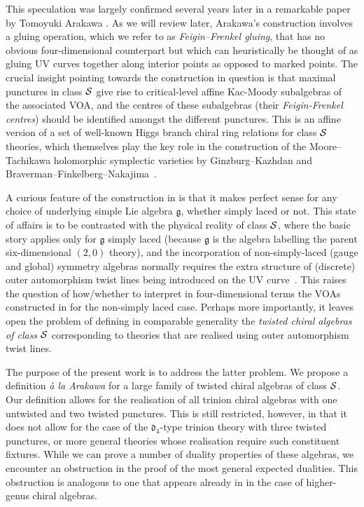 \documentclass[a4paper]{article}
\def\SS{{\cal S}}
\def\df{\mathfrak{d}}
\def\gf{\mathfrak{g}}
\begin{document}
This speculation was largely confirmed several years later in a remarkable paper by Tomoyuki Arakawa \cite{Arakawa:2018egx}. As we will review later, Arakawa's construction involves a gluing operation, which we refer to as \emph{Feigin--Frenkel gluing}, that has no obvious four-dimensional counterpart but which can heuristically be thought of as gluing UV curves together along interior points as opposed to marked points. The crucial insight pointing towards the construction in question is that maximal punctures in class $\SS$ give rise to critical-level affine Kac-Moody subalgebras of the associated VOA, and the centres of these subalgebras (their \emph{Feigin-Frenkel centres}) should be identified amongst the different punctures. This is an affine version of a set of well-known Higgs branch chiral ring relations for class $\SS$ theories, which themselves play the key role in the construction of the Moore--Tachikawa holomorphic symplectic varieties \cite{Moore:2011ee} by Ginzburg--Kazhdan \cite{Ginzburg:2018} and Braverman--Finkelberg--Nakajima~\cite{Nakajima:2015txa, Braverman:2016wma, Braverman:2017ofm, Braverman:2016pwk}.

A curious feature of the construction in \cite{Arakawa:2018egx} is that it makes perfect sense for any choice of underlying simple Lie algebra $\gf$, whether simply laced or not. This state of affairs is to be contrasted with the physical reality of class $\SS$, where the basic story applies only for $\gf$ simply laced (because $\gf$ is the algebra labelling the parent six-dimensional $(2,0)$ theory), and the incorporation of non-simply-laced (gauge and global) symmetry algebras normally requires the extra structure of (discrete) outer automorphism twist lines being introduced on the UV curve~\cite{Vafa:1997mh, Tachikawa:2009, Tachikawa:2011}. This raises the question of how/whether to interpret in four-dimensional terms the VOAs constructed in \cite{Arakawa:2018egx} for the non-simply laced case. Perhaps more importantly, it leaves open the problem of defining in comparable generality the \emph{twisted chiral algebras of class $\SS$} corresponding to theories that are realised using outer automorphism twist lines.

The purpose of the present work is to address the latter problem. We propose a definition \emph{\`a la Arakawa} for a large family of twisted chiral algebras of class $\SS$. Our definition allows for the realisation of all trinion chiral algebras with one untwisted and two twisted punctures. This is still restricted, however, in that it does not allow for the case of the $\df_4$-type trinion theory with three twisted punctures, or more general theories whose realisation require such constituent fixtures. While we can prove a number of duality properties of these algebras, we encounter an obstruction in the proof of the most general expected dualities. This obstruction is analogous to one that appears already in \cite{Arakawa:2018egx} in the case of higher-genus chiral algebras.
\end{document}
